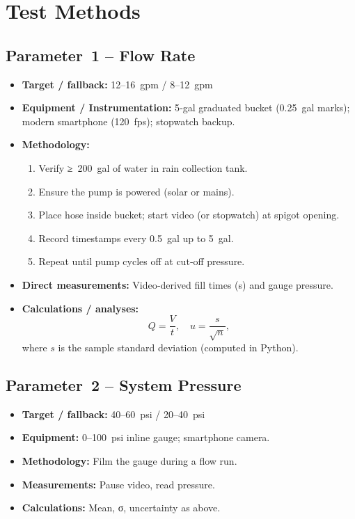 \documentclass[12pt]{report}
\begin{document}
\section{Test Methods}

\subsection{Parameter 1 – Flow Rate}
\begin{itemize}[leftmargin=*]
  \item \textbf{Target / fallback:} 12–16 gpm / 8–12 gpm
  \item \textbf{Equipment / Instrumentation:} 5‑gal graduated bucket (0.25 gal marks); modern smartphone (120 fps); stopwatch backup.
  \item \textbf{Methodology:}
    \begin{enumerate}[label=\arabic*., leftmargin=*]
      \item Verify ≥ 200 gal of water in rain collection tank.
      \item Ensure the pump is powered (solar or mains).
      \item Place hose inside bucket; start video (or stopwatch) at spigot opening.
      \item Record timestamps every 0.5 gal up to 5 gal.
      \item Repeat until pump cycles off at cut‐off pressure.
    \end{enumerate}
  \item \textbf{Direct measurements:} Video‐derived fill times (s) and gauge pressure.
  \item \textbf{Calculations / analyses:}
    \[
      Q = \frac{V}{t}, 
      \quad
      u = \frac{s}{\sqrt{n}},
    \]
    where $s$ is the sample standard deviation (computed in Python).
\end{itemize}

\subsection{Parameter 2 – System Pressure}
\begin{itemize}[leftmargin=*]
  \item \textbf{Target / fallback:} 40–60 psi / 20–40 psi
  \item \textbf{Equipment:} 0–100 psi inline gauge; smartphone camera.
  \item \textbf{Methodology:} Film the gauge during a flow run.
  \item \textbf{Measurements:} Pause video, read pressure.
  \item \textbf{Calculations:} Mean, σ, uncertainty as above.
\end{itemize}
\end{document}
